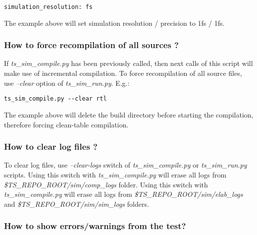 \documentclass{tropic_design_spec}
\begin{document}
\begin{lstlisting}
simulation_resolution: fs
\end{lstlisting}

The example above will set simulation resolution / precision to 1fs / 1fs.



\subsubsection{How to force recompilation of all sources ?}
\label{sec:how-to-force-recompilation-of-all-sources?}

If \textit{ts_sim_compile.py} has been previously called, then next calls of this script
will make use of incremental compilation. To force recompilation of all source files,
use \textit{--clear} option of \textit{ts_sim_run.py}. E.g.:

\begin{lstlisting}
ts_sim_compile.py --clear rtl
\end{lstlisting}

The example above will delete the build directory before starting the compilation,
therefore forcing clean-table compilation.


\subsubsection{How to clear log files ?}
\label{sec:how-to-clear-log-files}

To clear log files, use \textit{--clear-logs} switch of \textit{ts_sim_compile.py} or
\textit{ts_sim_run.py} scripts. Using this switch with \textit{ts_sim_compile.py} will
erase all logs from \textit{\$TS_REPO_ROOT/sim/comp_logs} folder. Using this switch with
\textit{ts_sim_compile.py} will erase all logs from \textit{\$TS_REPO_ROOT/sim/elab_logs}
and \textit{\$TS_REPO_ROOT/sim/sim_logs} folders.


\subsubsection{How to show errors/warnings from the test?}
\label{sec:how-to-show-errors-warningsf-from-the-test}
\end{document}
